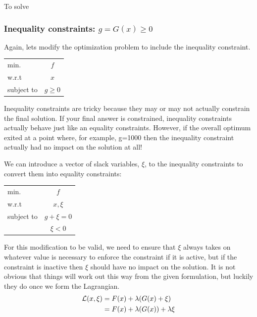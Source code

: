 \documentclass[conf]{new-aiaa}
\begin{document}
        To solve 


        \subsubsection{Inequality constraints: $g = G(x) \ge 0$}

        Again, lets modify the optimization problem to include the inequality constraint. 
        \begin{table}[H]
            \centering
            \begin{tabular}{lc}
                \hline
                min. & $f$ \\
                w.r.t & $x$ \\ 
                subject to & $g \ge 0$ \\ \hline 
            \end{tabular}
        \end{table}

        Inequality constraints are tricky because they may or may not actually constrain the final solution. 
        If your final answer is constrained, inequality constraints actually behave just like an equality constraints. 
        However, if the overall optimum exited at a point where, for example, g=1000 then the inequality constraint actually had no impact on the solution at all! 

        We can introduce a vector of slack variables, $\xi$, to the inequality constraints to convert them into equality constraints: 
        \begin{table}[H]
            \centering
            \begin{tabular}{lc}
                \hline
                min. & $f$ \\
                w.r.t & $x, \xi$ \\ 
                subject to & $g + \xi = 0$ \\ 
                           & $\xi < 0$ \\ \hline
            \end{tabular}
        \end{table}
        For this modification to be valid, we need to ensure that $\xi$ always takes on whatever value is necessary to enforce the constraint if it is active, but if the constraint is inactive then $\xi$ should have no impact on the solution. 
        It is not obvious that things will work out this way from the given formulation, but luckily they do once we form the Lagrangian. 
        \begin{align}
            \mathcal{L}(x,\xi) &= F(x) + \lambda(G(x) + \xi) \notag \\
                               &= F(x) + \lambda(G(x)) + \lambda \xi \label{eq:L_ineq}
        \end{align}
\end{document}
